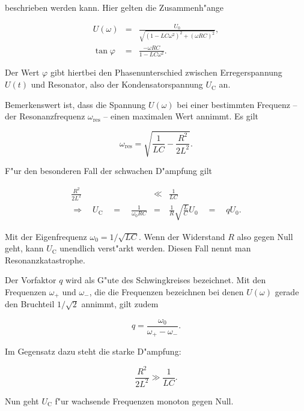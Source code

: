 		beschrieben werden kann.
		Hier gelten die Zusammenh"ange

		\begin{eqnarray*}
			U(\omega) & = & \frac{U_0}{\sqrt{\left( 1 - LC \omega^2 \right)^2 + \left( \omega RC\right)^2}}, \\
			\tan{\varphi} & = & \frac{-\omega RC}{1 - LC\omega^2}.
		\end{eqnarray*}

		Der Wert $\varphi$ gibt hiertbei den Phasenunterschied zwischen Erregerspannung $U(t)$ und Resonator, also der Kondensatorspannung $U_\mathrm{C}$ an.

		Bemerkenswert ist, dass die Spannung $U(\omega)$ bei einer bestimmten Frequenz -- der Resonanzfrequenz $\omega_\mathrm{res}$ -- einen maximalen Wert annimmt.
		Es gilt

		\begin{equation*}
			\omega_\mathrm{res} = \sqrt{\frac{1}{LC}-\frac{R^2}{2L^2}}.
		\end{equation*}

		F"ur den besonderen Fall der schwachen D"ampfung gilt

		\begin{eqnarray*}
			\frac{R^2}{2L^2} & \ll & \frac{1}{LC} \\
			\Rightarrow \quad U_\mathrm{C} \quad = \quad \frac{1}{\omega_0 RC} & = & \frac{1}{R} \sqrt{\frac{L}{C}} U_0 \quad = \quad q U_0.
		\end{eqnarray*}

		Mit der Eigenfrequenz $\omega_0 = 1/\sqrt{LC}$.
		Wenn der Widerstand $R$ also gegen Null geht, kann $U_\mathrm{C}$ unendlich verst"arkt werden.
		Diesen Fall nennt man Resonanzkatastrophe.

		Der Vorfaktor $q$ wird als G"ute des Schwingkreises bezeichnet.
		Mit den Frequenzen $\omega_+$ und $\omega_-$, die die Frequenzen bezeichnen bei denen $U(\omega)$ gerade den Bruchteil $1/\sqrt{2}$ annimmt, gilt zudem

		\begin{equation*}
			q = \frac{\omega_0}{\omega_+ - \omega_-}.
		\end{equation*}

		Im Gegensatz dazu steht die starke D"ampfung:

		\begin{equation*}
			\frac{R^2}{2L^2} \gg \frac{1}{LC}.
		\end{equation*}

		Nun geht $U_\mathrm{C}$ f"ur wachsende Frequenzen monoton gegen Null.